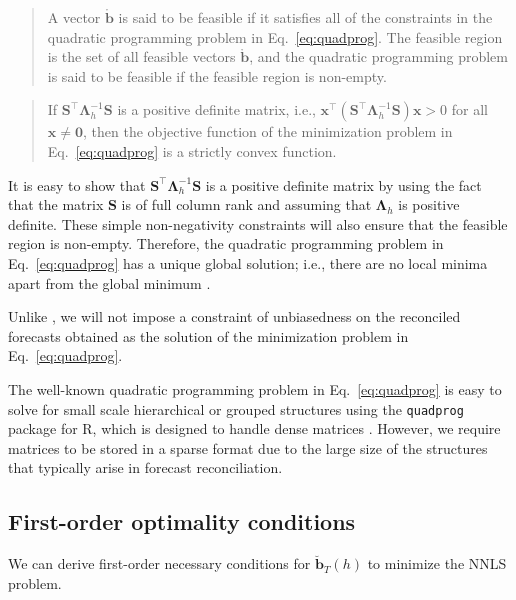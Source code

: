 \documentclass[11pt]{article}
\newcommand{\0}{\phantom{0}}
\begin{document}
\begin{quote}
	A vector $\mathring{\bm{b}}$ is said to be feasible if it satisfies all of the constraints in the quadratic programming problem in Eq.~\eqref{eq:quadprog}. The feasible region is the set of all feasible vectors $\mathring{\bm{b}}$, and the quadratic programming problem is said to be feasible if the feasible region is non-empty.
\end{quote}

\begin{quote}
	If $\bm{S}^\top\bm{\Lambda}_{h}^{-1}\bm{S}$ is a positive definite matrix, i.e., $\bm{x}^\top(\bm{S}^\top\bm{\Lambda}_{h}^{-1}\bm{S})\bm{x} > 0$ for all $\bm{x} \neq \bm{0}$, then the objective function of the minimization problem in Eq.~\eqref{eq:quadprog} is a strictly convex function.
\end{quote}

It is easy to show that $\bm{S}^\top\bm{\Lambda}_{h}^{-1}\bm{S}$ is a positive definite matrix by using the fact that the matrix $\bm{S}$ is of full column rank and assuming that $\bm{\Lambda}_{h}$ is positive definite. These simple non-negativity constraints will also ensure that the feasible region is non-empty. Therefore, the quadratic programming problem in Eq.~\eqref{eq:quadprog} has a unique global solution; i.e., there are no local minima apart from the global minimum \citep{Turl2015}.

Unlike \citet{Wick2018}, we will not impose a constraint of unbiasedness on the reconciled forecasts obtained as the solution of the minimization problem in Eq.~\eqref{eq:quadprog}.

The well-known quadratic programming problem in Eq.~\eqref{eq:quadprog} is easy to solve for small scale hierarchical or grouped structures using the \texttt{quadprog} package for R, which is designed to handle dense matrices \citep{quadprog2013}. However, we require matrices to be stored in a sparse format due to the large size of the structures that typically arise in forecast reconciliation.

\subsection{First-order optimality conditions}

We can derive first-order necessary conditions for $\breve{\bm{b}}_{T}(h)$ to minimize the NNLS problem.
\end{document}
